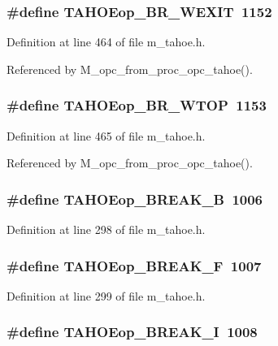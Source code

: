 \subsubsection{\setlength{\rightskip}{0pt plus 5cm}\#define TAHOEop\_\-BR\_\-WEXIT~1152}\label{m__tahoe_8h_85d4bc748764bf7367562f783ebe2cc8}




Definition at line 464 of file m\_\-tahoe.h.

Referenced by M\_\-opc\_\-from\_\-proc\_\-opc\_\-tahoe().
\subsubsection{\setlength{\rightskip}{0pt plus 5cm}\#define TAHOEop\_\-BR\_\-WTOP~1153}\label{m__tahoe_8h_58ff672afa5fcaad1e9721e197315bb9}




Definition at line 465 of file m\_\-tahoe.h.

Referenced by M\_\-opc\_\-from\_\-proc\_\-opc\_\-tahoe().
\subsubsection{\setlength{\rightskip}{0pt plus 5cm}\#define TAHOEop\_\-BREAK\_\-B~1006}\label{m__tahoe_8h_69c095be7fb5580630343236eae08001}




Definition at line 298 of file m\_\-tahoe.h.
\subsubsection{\setlength{\rightskip}{0pt plus 5cm}\#define TAHOEop\_\-BREAK\_\-F~1007}\label{m__tahoe_8h_88438e4ddb0d90bf73eac5235e11ac3f}




Definition at line 299 of file m\_\-tahoe.h.
\subsubsection{\setlength{\rightskip}{0pt plus 5cm}\#define TAHOEop\_\-BREAK\_\-I~1008}\label{m__tahoe_8h_2e736d3d1b1cba4a8ebd50ab5666f94f}




